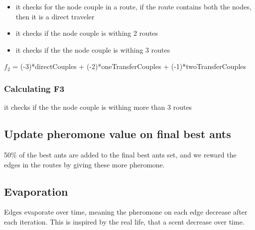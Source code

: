 \begin{itemize}
\item it checks for the node couple in a route, if the route contains both the nodes, then it is a direct traveler
\item it checks if the node couple is withing 2 routes
\item it checks if the the node couple is withing 3 routes
\end{itemize}

$f_2$ = (-3)*directCouples + (-2)*oneTransferCouples + (-1)*twoTransferCouples

\subsubsection{Calculating F3}
it checks if the the node couple is withing more than 3 routes


\subsection{Update pheromone value on final best ants}

\begin{algorithm}[H]
\end{algorithm}

50\% of the best ants are added to the final best ants set, and we reward the edges in the routes by giving these more pheromone.

\subsection{Evaporation}

\begin{algorithm}[H]
\end{algorithm}

Edges evaporate over time, meaning the pheromone on each edge decrease after each iteration. This is inspired by the real life, that a scent decrease over time.


